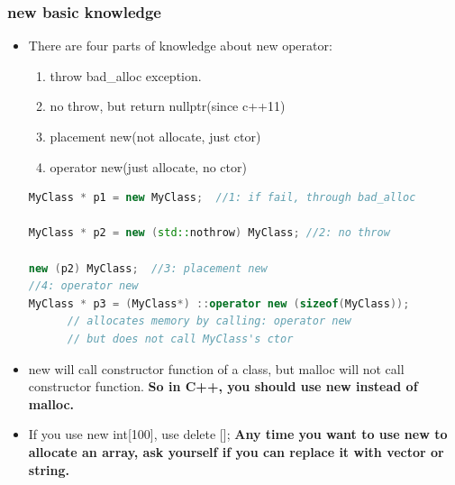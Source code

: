 \documentclass[a4paper,12pt,twoside]{book}
\begin{document}
\subsubsection{new basic knowledge}
\begin{itemize}
\item There are four parts of knowledge about new operator:
\begin{enumerate}
\item throw bad\_alloc exception.
\item no throw, but return nullptr(since c++11)
\item placement new(not allocate, just ctor)
\item operator new(just allocate, no ctor)
\end{enumerate}

\begin{lstlisting}[frame=single, language=c++]
MyClass * p1 = new MyClass;  //1: if fail, through bad_alloc

MyClass * p2 = new (std::nothrow) MyClass; //2: no throw

new (p2) MyClass;  //3: placement new
//4: operator new
MyClass * p3 = (MyClass*) ::operator new (sizeof(MyClass));
      // allocates memory by calling: operator new
      // but does not call MyClass's ctor
\end{lstlisting}

\item new will call constructor function of a class, but malloc will not call constructor function.  \textbf{So in C++, you should use new instead of malloc.}

\item If you use new int[100], use delete [];  \textbf{Any time you want to use new to allocate an array, ask yourself if you can replace it with vector or string.}

\end{itemize}
\end{document}
